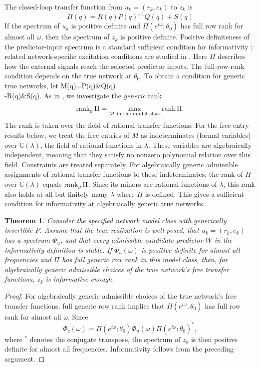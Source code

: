\documentclass[journal,twoside,web]{ieeecolor}
\newtheorem{theorem}{Theorem}
\begin{document}
The closed-loop transfer function from $u_k=(r_k,e_k)$ to $z_k$ is
%
$$\Pi(q)=R(q)P(q)^{-1}Q(q)+S(q)$$
%
If the spectrum of $u_k$ is positive definite and
$\Pi\left(e^{i\omega};\theta_0\right)$ has full row rank for almost all
$\omega$, then the spectrum of $z_k$ is positive definite.
Positive definiteness of the predictor-input spectrum is a standard sufficient
condition for informativity \cite{Ljung1999}; related network-specific
excitation conditions are studied in \cite{5325719,BOMBOIS2023110742}.
Here $\Pi$ describes how the external
signals reach the selected predictor inputs.
The full-row-rank condition depends on the true network at $\theta_0$.
To obtain a condition for generic true networks, let
%
\BEQ
M(q)=\BBM P(q)&Q(q)\\-R(q)&S(q)\EBM.
\EEQ
%
As in \cite{BOMBOIS2023110742}, we investigate the {\it generic} rank
%
$$\operatorname{rank}_{g} \Pi=\max_{M\text{ in the model class}}\operatorname{rank}\Pi.$$
%
The rank is taken over the field of rational transfer functions. For the
free-entry results below, we treat the free entries of $M$ as indeterminates
(formal variables) over $\mathbb C(\lambda)$, the field of rational functions
in $\lambda$. These variables are algebraically independent, meaning that
they satisfy no nonzero polynomial relation over this field. Constraints
are treated separately.
For algebraically generic admissible assignments of rational transfer functions
to these indeterminates, the rank of $\Pi$ over $\mathbb C(\lambda)$ equals
$\operatorname{rank}_g\Pi$. Since its minors are
rational functions of $\lambda$, this rank also holds at all but finitely
many $\lambda$ where $\Pi$ is defined. This gives a sufficient condition
for informativity at algebraically generic true networks.
%
\begin{theorem}\label{thm:informativity}
%
Consider the specified network model class with generically invertible $P$.
Assume that the true realization is well-posed, that $u_k=(r_k,e_k)$ has
a spectrum $\Phi_u$, and that every admissible
candidate predictor $W$ in the informativity definition is stable. If
$\Phi_u(\omega)$ is positive definite for almost all frequencies and $\Pi$
has full generic row rank in this model class, then, for algebraically
generic admissible choices of the true network's free transfer functions,
$z_k$ is informative enough.
%
\end{theorem}
%
\begin{proof}
For algebraically generic admissible choices of the true network's free transfer functions,
full generic row rank implies that $\Pi(e^{i\omega};\theta_0)$ has full row rank
for almost all $\omega$. Since
%
$$\Phi_z(\omega)=\Pi(e^{i\omega};\theta_0)\Phi_u(\omega)
\Pi(e^{i\omega};\theta_0)^*,$$
%
where $^*$ denotes the conjugate transpose, the spectrum of $z_k$ is then
positive definite for almost all frequencies. Informativity follows from the
preceding argument.
\end{proof}
\end{document}
